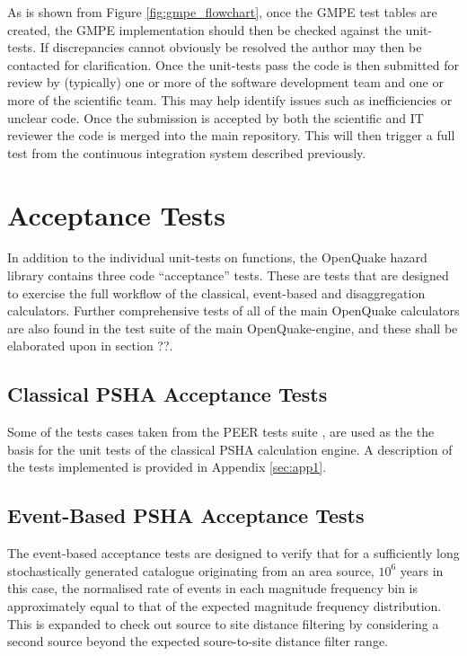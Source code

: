 As is shown from Figure \ref{fig:gmpe_flowchart}, once the GMPE test 
tables are created, the GMPE implementation should then be checked 
against the unit-tests. If discrepancies cannot obviously be resolved
the author may then be contacted for clarification. 
Once the unit-tests pass the code is then submitted for review by 
(typically) one or more of the software development team and one or
more of the scientific team. This may help identify issues such as 
inefficiencies or unclear code. Once the submission is accepted by 
both the scientific and IT reviewer the code is merged into the main
repository. 
This will then trigger a full test from the continuous integration 
system described previously.

%
\section{Acceptance Tests}
In addition to the individual unit-tests on functions, the OpenQuake hazard 
library contains three code ``acceptance'' tests. These are tests that are 
designed to exercise the full workflow of the classical, event-based and 
disaggregation calculators. Further comprehensive tests of all of the main 
OpenQuake calculators are also found in the test suite of the main 
OpenQuake-engine, and these shall be elaborated upon in section ??.
%
\subsection{Classical PSHA Acceptance Tests}
Some of the tests cases taken from the PEER tests suite \citep{thomas2010}, 
are used as the the basis for the unit tests of the classical PSHA 
calculation engine. A description of the tests implemented is 
provided in Appendix \ref{sec:app1}.

\subsection{Event-Based PSHA Acceptance Tests}

The event-based acceptance tests are designed to verify that for 
a sufficiently long stochastically generated catalogue originating
from an area source, $10^6$ years in this case, the normalised 
rate of events in each magnitude frequency bin is approximately
equal to that of the expected magnitude frequency distribution. 
%
This is expanded to check out source to site distance filtering by 
considering a second source beyond the expected soure-to-site 
distance filter range. 

